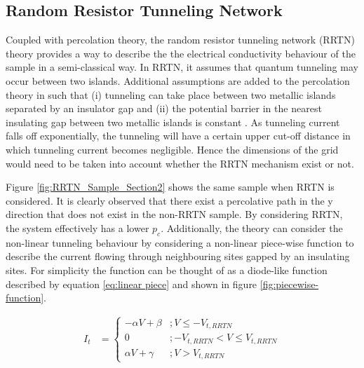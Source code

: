 \documentclass[11pt,a4paper]{report}
\begin{document}
\subsection{Random Resistor Tunneling Network} \label{section:RRTN}


Coupled with percolation theory, the random resistor tunneling network (RRTN) theory provides a way to describe the the electrical conductivity behaviour of the sample in a semi-classical way. In RRTN, it assumes that quantum tunneling may occur between two islands. Additional assumptions are added to the percolation theory in such that (i) tunneling can take place between two metallic islands separated by an insulator gap and (ii) the potential barrier in the nearest insulating gap between two metallic islands is constant \cite{Stauffer_RRTN_2009}. As tunneling current falls off exponentially, the tunneling will have a certain upper cut-off distance in which tunneling current becomes negligible. Hence the dimensions of the grid would need to be taken into account whether the RRTN mechanism exist or not.

Figure \ref{fig:RRTN_Sample_Section2} shows the same sample when RRTN is considered. It is clearly observed that there exist a percolative path in the y direction that does not exist in the non-RRTN sample. By considering RRTN, the system effectively has a lower $p_c$. Additionally, the theory can consider the non-linear tunneling behaviour by considering a non-linear piece-wise function to describe the current flowing through neighbouring sites gapped by an insulating sites. For simplicity the function can be thought of as a diode-like function described by equation \ref{eq:linear piece} and shown in figure \ref{fig:piecewise-function}.

\begin{align}
     I_{t} &=
  \begin{cases}
        -\alpha V + \beta & ; V \leq -V_{t,RRTN}\\
        0 & ; -V_{t,RRTN} < V \leq V_{t,RRTN} \\
        \alpha V + \gamma & ; V > V_{t,RRTN}
  \end{cases}
  \label{eq:linear piece}
\end{align}
\end{document}
